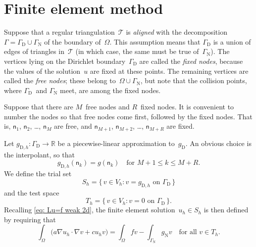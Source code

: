 \section{Finite element method}

Suppose that a regular triangulation~$\mathcal{T}$ is \emph{aligned} with 
the decomposition $\Gamma=\Gamma_{\mathrm{D}}\cup\Gamma_{\mathrm{N}}$ of the 
boundary of~$\Omega$.  This assumption means that $\Gamma_{\mathrm{D}}$ 
is a union of edges of triangles in~$\mathcal{T}$ (in which 
case, the same must be true of~$\Gamma_{\mathrm{N}}$).  The vertices lying on 
the Dirichlet boundary~$\Gamma_{\mathrm{D}}$ are called the \emph{fixed nodes}, 
because the values of the solution~$u$ are fixed at these points.  The 
remaining vertices are called the \emph{free nodes}; these belong 
to~$\Omega\cup\Gamma_{\mathrm{N}}$, but note that the collision points, where
$\Gamma_{\mathrm{D}}$~and $\Gamma_{\mathrm{N}}$ meet, are among the fixed nodes.

Suppose that there are $M$~free nodes and $R$~fixed nodes. It is convenient to 
number the nodes so that free nodes come first, followed by the fixed nodes.
That is, $\mathsf{n}_1$, $\mathsf{n}_2$, \dots, 
$\mathsf{n}_M$ are free, and $\mathsf{n}_{M+1}$, $\mathsf{n}_{M+2}$, \dots, 
$\mathsf{n}_{M+R}$ are fixed.  

Let $g_{\mathrm{D},h}:\Gamma_{\mathrm{D}}\to\mathbb{R}$ be a piecewise-linear 
approximation to~$g_{\mathrm{D}}$.  An obvious choice is the interpolant, so
that
\[
g_{\mathrm{D},h}(\mathsf{n}_k)=g(\mathsf{n}_k)\quad\text{for $M+1\le k\le M+R$.}
\]
We define the trial set
\[
S_h=\{\,v\in V_h:\text{$v=g_{\mathrm{D},h}$ on $\Gamma_{\mathrm{D}}$}\,\}
\]
and the test space
\[
T_h=\{\,v\in V_h:\text{$v=0$ on $\Gamma_{\mathrm{D}}$}\,\}.
\]
Recalling \eqref{eq: Lu=f weak 2d}, the finite element 
solution~$u_h\in S_h$ is then defined by requiring that
\begin{equation}\label{eq: FEM 2d}
\int_\Omega\bigl(a\nabla u_h\cdot\nabla v+cu_hv\bigr)=\int_\Omega fv
	-\int_{\Gamma_{\mathrm{N}}}g_{\mathrm{N}}v
	\quad\text{for all $v\in T_h$.}
\end{equation}

